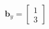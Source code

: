 \documentclass[preview]{standalone}
\begin{document}
\begin{align*}
\mathbf{b}_y = \begin{bmatrix} 1 \\ 3 \end{bmatrix}
\end{align*}
\end{document}

